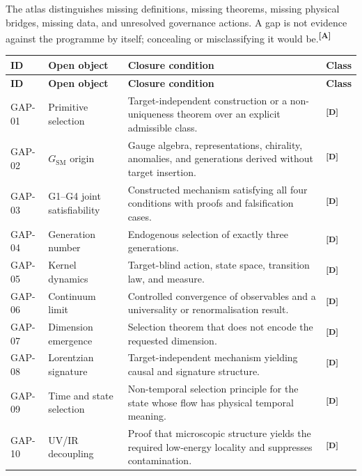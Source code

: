 \documentclass[12pt,a4paper,twoside]{article}
\theoremstyle{plain}
\theoremstyle{definition}
\theoremstyle{remark}
\newcommand{\catmark}[1]{\textsuperscript{\textsf{\textbf{[#1]}}}}
\begin{document}
The atlas distinguishes missing definitions, missing theorems, missing
physical bridges, missing data, and unresolved governance actions. A gap is
not evidence against the programme by itself; concealing or misclassifying it
would be.\catmark{A}

\begin{longtable}{@{}
>{\raggedright\arraybackslash}p{}
>{\raggedright\arraybackslash}p{}
>{\raggedright\arraybackslash}p{}
>{\raggedright\arraybackslash}p{}
@{}}
\toprule
\textbf{ID} & \textbf{Open object} & \textbf{Closure condition} &
\textbf{Class}\\
\midrule
\endfirsthead
\toprule
\textbf{ID} & \textbf{Open object} & \textbf{Closure condition} &
\textbf{Class}\\
\midrule
\endhead
GAP-01 & Primitive selection & Target-independent construction or a
non-uniqueness theorem over an explicit admissible class. & \catmark{D}\\
GAP-02 & $G_{\mathrm{SM}}$ origin & Gauge algebra, representations, chirality,
anomalies, and generations derived without target insertion. & \catmark{D}\\
GAP-03 & G1--G4 joint satisfiability & Constructed mechanism satisfying all
four conditions with proofs and falsification cases. & \catmark{D}\\
GAP-04 & Generation number & Endogenous selection of exactly three generations.
& \catmark{D}\\
GAP-05 & Kernel dynamics & Target-blind action, state space, transition law,
and measure. & \catmark{D}\\
GAP-06 & Continuum limit & Controlled convergence of observables and a
universality or renormalisation result. & \catmark{D}\\
GAP-07 & Dimension emergence & Selection theorem that does not encode the
requested dimension. & \catmark{D}\\
GAP-08 & Lorentzian signature & Target-independent mechanism yielding causal
and signature structure. & \catmark{D}\\
GAP-09 & Time and state selection & Non-temporal selection principle for the
state whose flow has physical temporal meaning. & \catmark{D}\\
GAP-10 & UV/IR decoupling & Proof that microscopic structure yields the
required low-energy locality and suppresses contamination. & \catmark{D}\\

\end{longtable}
\end{document}
